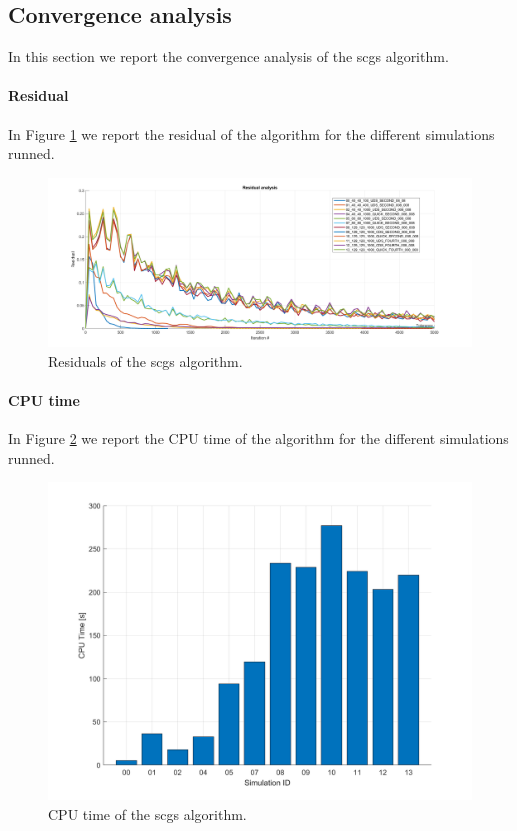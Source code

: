 \subsection{Convergence analysis}
\label{subsec:convergence_analysis}

In this section we report the convergence analysis of the \acrshort{scgs} algorithm.

\paragraph{Residual}

In Figure \ref{fig:residual} we report the residual of the algorithm for the different simulations runned.

\begin{figure}[H]
    \centering
    \includegraphics[width=\textwidth]{./img/residual}
    \caption{Residuals of the \acrshort{scgs} algorithm.}
    \label{fig:residual}
\end{figure}


\paragraph{CPU time}

In Figure \ref{fig:cpu_time} we report the CPU time of the algorithm for the different simulations runned.

\begin{figure}[H]
    \centering
    \includegraphics[width=\textwidth]{./img/CPU_time}
    \caption{CPU time of the \acrshort{scgs} algorithm.}
    \label{fig:cpu_time}
\end{figure}